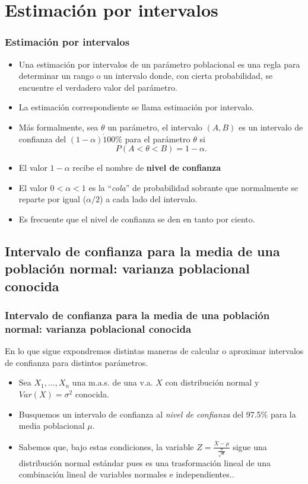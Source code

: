 \section{Estimación por intervalos}


\begin{frame}
\frametitle{Estimación por intervalos}
\begin{itemize}
\item   Una estimación por intervalos de un parámetro poblacional es una
  regla para determinar un rango o un intervalo donde, con cierta
  probabilidad, se encuentre el verdadero valor del parámetro.
\item   La estimación correspondiente se llama estimación por intervalo. 
\item Más formalmente, sea $\theta$ un parámetro, el intervalo $\left(A,B\right)$ es un intervalo de confianza del
$(1-\alpha)\dot 100\% $ para el parámetro $\theta$ si $$P(A<\theta<B)=1-\alpha.$$
\item El valor $1-\alpha$ recibe el nombre de \textbf{nivel de confianza}
\item El valor  $0<\alpha<1$ es la ``\emph{cola}'' de
probabilidad sobrante que normalmente se reparte por igual ($\alpha/2$) a cada lado del
intervalo.
\item  Es  frecuente que el nivel de confianza se den en tanto por ciento.
\end{itemize}
\end{frame}
   \subsection{Intervalo de confianza para la media de una población
    normal: varianza poblacional conocida}
\begin{frame}
\frametitle{Intervalo de confianza para la media de una población
    normal: varianza poblacional conocida}
En lo que sigue expondremos distintas maneras de calcular o aproximar intervalos de confianza
para distintos parámetros.

 \begin{itemize}
\item Sea $X_{1},\ldots,X_{n}$ una m.a.s. de una v.a. $X$ con distribución
    normal y $Var(X)=\sigma^2$ conocida.
\item  Busquemos un intervalo de confianza al \emph{nivel de confianza} del
    97.5\% para la media poblacional $\mu$.
\item  Sabemos que, bajo estas condiciones,  la variable
 $Z=\frac{\overline{X}-\mu}{\frac{\sigma}{\sqrt{n}}}$
    sigue una distribución normal estándar pues es una trasformación lineal
     de una combinación lineal de
    variables normales e independientes..
\end{itemize}

\end{frame}


